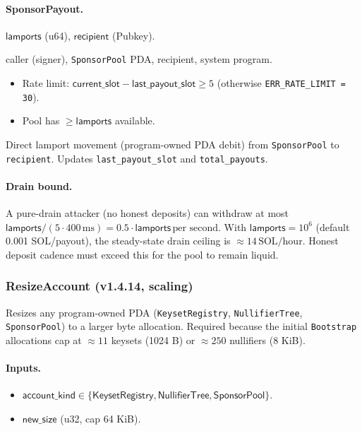 \paragraph{SponsorPayout.}
\begin{description}[leftmargin=2em,itemsep=0pt]
  \item[Inputs] $\mathsf{lamports}$ (u64), $\mathsf{recipient}$ (Pubkey).
  \item[Accounts] caller (signer), \texttt{SponsorPool} PDA, recipient, system program.
  \item[Checks]
    \begin{itemize}[leftmargin=2em,itemsep=0pt]
      \item Rate limit: $\mathsf{current\_slot} - \mathsf{last\_payout\_slot} \geq 5$ (otherwise \texttt{ERR\_RATE\_LIMIT = 30}).
      \item Pool has $\geq \mathsf{lamports}$ available.
    \end{itemize}
  \item[Effect] Direct lamport movement (program-owned PDA debit) from
    \texttt{SponsorPool} to \texttt{recipient}. Updates \texttt{last\_payout\_slot}
    and \texttt{total\_payouts}.
\end{description}

\paragraph{Drain bound.} A pure-drain attacker (no honest deposits)
can withdraw at most $\mathsf{lamports} / (5 \cdot 400\,\text{ms}) =
0.5 \cdot \mathsf{lamports}\,\text{per second}$. With
$\mathsf{lamports} = 10^6$ (default 0.001 SOL/payout), the steady-state
drain ceiling is $\approx 14\,\text{SOL/hour}$. Honest deposit cadence
must exceed this for the pool to remain liquid.

\subsubsection{ResizeAccount (v1.4.14, scaling)}
\label{sec:onchain-instr-resize}

Resizes any program-owned PDA (\texttt{KeysetRegistry}, \texttt{NullifierTree},
\texttt{SponsorPool}) to a larger byte allocation. Required because
the initial \texttt{Bootstrap} allocations cap at $\approx 11$
keysets (1024 B) or $\approx 250$ nullifiers (8 KiB).

\paragraph{Inputs.}
\begin{itemize}[leftmargin=2em,itemsep=0pt]
  \item $\mathsf{account\_kind} \in \{\mathsf{KeysetRegistry}, \mathsf{NullifierTree}, \mathsf{SponsorPool}\}$.
  \item $\mathsf{new\_size}$ (u32, cap 64 KiB).
\end{itemize}

